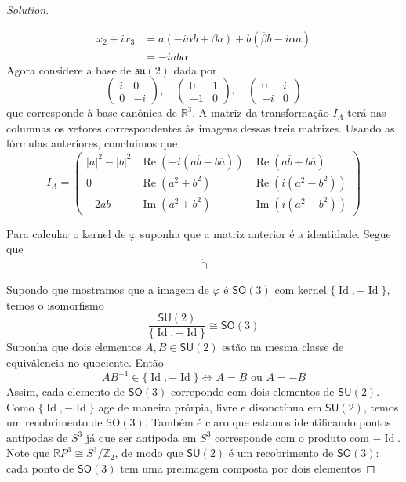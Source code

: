 \begin{proof}[Solution]
\begin{enumerate}[label=\alph*.]
\begin{align*}
	x_2+ix_3&=a(-i \alpha b+\beta a)+b(\overline{\beta}b-i\alpha a)\\
	&=-iab \alpha
\end{align*}
Agora considere a base de $\mathfrak{su}(2)$ dada por
\[\begin{pmatrix} i&0\\0&-i \end{pmatrix},\quad \begin{pmatrix} 0&1\\-1&0 \end{pmatrix} ,\quad \begin{pmatrix} 0&i\\-i&0 \end{pmatrix}  \]
que corresponde à base canônica de $\mathbb{R}^{3}$. A matriz da transformação $I_A$  terá nas columnas os vetores correspondentes às imagens dessas treis matrizes. Usando as fórmulas anteriores, concluimos que
\[I_A=\begin{pmatrix} |a|^2-|b|^2 & \operatorname{Re}(-i(a\overline{b}-b \overline{a}))& \operatorname{Re}(a \overline{b}+b \overline{a})\\
0 & \operatorname{Re}(a^2+b^2)& \operatorname{Re}(i(a^2-b^2)) \\
-2ab& \operatorname{Im}(a^2+b^2)&\operatorname{Im}(i(a^2-b^2))\end{pmatrix} \]
\end{enumerate}
Para calcular o kernel de $\varphi$ suponha que a matriz anterior é a identidade. Segue que
\begin{align*}
	\ddot{\cap}
\end{align*}

\item Supondo que mostramos que a imagem de $\varphi$ é $\mathsf{SO}(3)$ com kernel $\{\operatorname{Id},-\operatorname{Id}\}$, temos o isomorfismo
	\[\dfrac{\mathsf{SU}(2)}{\{\operatorname{Id},-\operatorname{Id}\}}\cong \mathsf{SO}(3)\]
Suponha que dois elementos $A,B \in\mathsf{SU}(2)$ estão na mesma classe de equivâlencia no quociente. Então
\[AB^{-1}\in\{\operatorname{Id},-\operatorname{Id}\}\iff A=B \text{ ou }A=-B \]
Assim, cada elemento de $\mathsf{SO}(3)$ correponde com dois elementos de $\mathsf{SU}(2)$. Como $\{\operatorname{Id},-\operatorname{Id}\}$ age de maneira prórpia, livre e disonctínua em $\mathsf{SU}(2)$, temos um recobrimento de $\mathsf{SO}(3)$. Também é claro que estamos identificando pontos antípodas de $S^3$ já que ser antípoda em $S^3$ corresponde com o produto com $-\operatorname{Id}$. Note que $\mathbb{R}P^{3}\cong S^3/\mathbb{Z}_2$, de modo que $\mathsf{SU}(2)$ é um recobrimento de $\mathsf{SO}(3)$: cada ponto de $\mathsf{SO}(3)$ tem uma preimagem composta por dois elementos
\end{proof}

